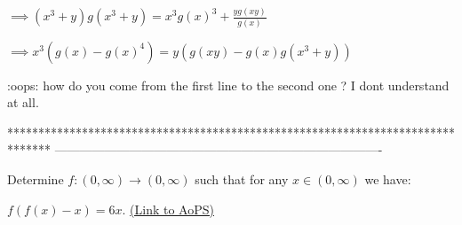 \begin{solution}
	\begin{tcolorbox} $\implies (x^3+y)g(x^3+y)=x^3g(x)^3 + \frac{yg(xy)}{g(x)}$

$\implies x^3(g(x)-g(x)^4)=y(g(xy)-g(x)g(x^3+y))$\end{tcolorbox}


:oops: how do you come from the first line to the second one ? I dont understand at all.
\end{solution}



*******************************************************************************
-------------------------------------------------------------------------------

\begin{problem}
	Determine $f:(0, \infty) \rightarrow (0, \infty)$ such that for any $x \in (0, \infty)$ we have:

$f(f(x)-x)=6x$.
	\flushright \href{https://artofproblemsolving.com/community/c6h393617}{(Link to AoPS)}
\end{problem}



